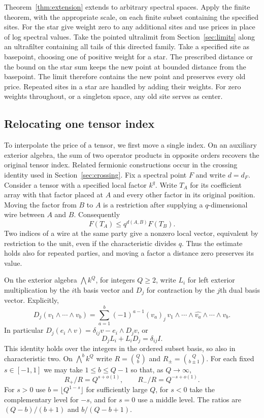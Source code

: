 Theorem~\ref{thm:extension} extends to arbitrary spectral spaces.
Apply the finite theorem, with the appropriate scale, on each finite
subset containing the specified sites. For the star give weight zero
to any additional sites and use prices in place of log spectral
values. Take the pointed ultralimit from Section~\ref{sec:limits}
along an ultrafilter containing all tails of this directed family.
Take a specified site as basepoint, choosing one of positive weight
for a star. The prescribed distance or the bound on the star sum keeps
the new point at bounded distance from the basepoint. The limit therefore
contains the new point and preserves every old price. Repeated sites
in a star are handled by adding their weights. For zero weights
throughout, or a singleton space, any old site serves as center.
\subsection{Relocating one tensor index}

To interpolate the price of a tensor, we first move a single index.
On an auxiliary exterior algebra, the sum of two operator products
in opposite orders recovers the original tensor index. Related fermionic constructions occur in
the crossing identity \cite{Anthropic,Khoruzhii} used in
Section~\ref{sec:crossing}.
Fix a spectral point $F$ and write $d=d_F$. Consider a tensor with a
specified local factor $k^q$. Write $T_A$ for its coefficient array
with that factor placed at $A$ and every other factor in its original
position. Moving the factor from $B$ to $A$ is a restriction after
supplying a $q$-dimensional wire between $A$ and $B$. Consequently
\[
                         F(T_A)\le q^{d(A,B)}F(T_B).
\]
Two indices of a wire at the same party give a nonzero local vector,
equivalent by restriction to the unit, even if the characteristic
divides $q$. Thus the estimate holds also for repeated parties, and
moving a factor a distance zero preserves its value.

On the exterior algebra $\bigwedge k^Q$, for integers $Q\ge2$, write
$L_i$ for left exterior multiplication by the $i$th basis vector
and $D_j$ for contraction by the $j$th dual basis vector. Explicitly,
\[
 D_j(v_1\wedge\cdots\wedge v_b)
   =\sum_{a=1}^b(-1)^{a-1}(v_a)_j\,
      v_1\wedge\cdots\wedge\widehat{v_a}\wedge\cdots\wedge v_b .
\]
In particular $D_j(e_i\wedge v)=\delta_{ij}v-e_i\wedge D_jv$, or
\begin{equation}\label{eq:wire-exterior}
                       D_j L_i+L_i D_j=\delta_{ij}I .
\end{equation}
This identity holds over the integers in the ordered subset basis, so
also in characteristic two. On $\bigwedge^b k^Q$ write
$R=\binom Qb$ and $R_\pm=\binom Q{b\pm1}$. For each fixed
$s\in[-1,1]$ we may take $1\le b\le Q-1$ so that, as $Q\to\infty$,
\begin{equation}\label{eq:wire-binomial}
                   R_+/R=Q^{s+o(1)},\qquad R_-/R=Q^{-s+o(1)} .
\end{equation}
For $s>0$ use $b=\lfloor Q^{1-s}\rfloor$ for sufficiently large
$Q$, for $s<0$ take the complementary level for $-s$, and for $s=0$
use a middle level. The ratios are $(Q-b)/(b+1)$ and $b/(Q-b+1)$.

